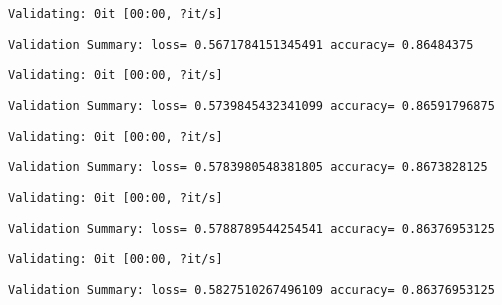 \documentclass[11pt]{article}
\begin{document}
    
    \begin{Verbatim}[commandchars=\\\{\}]
Validating: 0it [00:00, ?it/s]
    \end{Verbatim}

    
    \begin{Verbatim}[commandchars=\\\{\}]
Validation Summary: loss= 0.5671784151345491 accuracy= 0.86484375
    \end{Verbatim}

    
    \begin{Verbatim}[commandchars=\\\{\}]
Validating: 0it [00:00, ?it/s]
    \end{Verbatim}

    
    \begin{Verbatim}[commandchars=\\\{\}]
Validation Summary: loss= 0.5739845432341099 accuracy= 0.86591796875
    \end{Verbatim}

    
    \begin{Verbatim}[commandchars=\\\{\}]
Validating: 0it [00:00, ?it/s]
    \end{Verbatim}

    
    \begin{Verbatim}[commandchars=\\\{\}]
Validation Summary: loss= 0.5783980548381805 accuracy= 0.8673828125
    \end{Verbatim}

    
    \begin{Verbatim}[commandchars=\\\{\}]
Validating: 0it [00:00, ?it/s]
    \end{Verbatim}

    
    \begin{Verbatim}[commandchars=\\\{\}]
Validation Summary: loss= 0.5788789544254541 accuracy= 0.86376953125
    \end{Verbatim}

    
    \begin{Verbatim}[commandchars=\\\{\}]
Validating: 0it [00:00, ?it/s]
    \end{Verbatim}

    
    \begin{Verbatim}[commandchars=\\\{\}]
Validation Summary: loss= 0.5827510267496109 accuracy= 0.86376953125
    \end{Verbatim}
\end{document}
